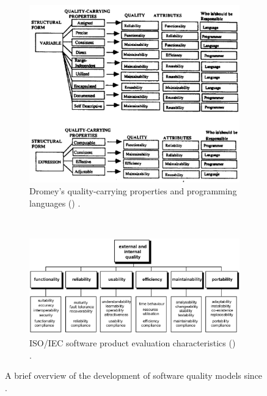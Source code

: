 \begin{figure}[h!]
  ~
  \begin{subfigure}[t]{0.49\linewidth}
    \centering
    \includegraphics[width=0.8\linewidth]{dromey-quality-carrying-properites}
    \caption{Dromey's quality-carrying properties and programming languages (\citeyear{Dromey:1995wy}) \citep{Dromey:1995wy}.}
    \label{fig:background:software-quality:quality-models:development:dromey}
  \end{subfigure}
  ~
  \begin{subfigure}[t]{0.49\linewidth}
    \centering
    \includegraphics[width=\linewidth]{iso-software-product-evaluation-characteristics}
    \caption{ISO/IEC software product evaluation characteristics (\citeyear{ISO9126:1999}) \citep{ISO9126:1999}.}
    \label{fig:background:software-quality:quality-models:development:iso}
  \end{subfigure}
  \caption[Overview of software quality models]{A brief overview of the development of software quality models since \citeyear{McCall:1977uy}.}
  \label{fig:background:software-quality:quality-models:development}
\end{figure}
